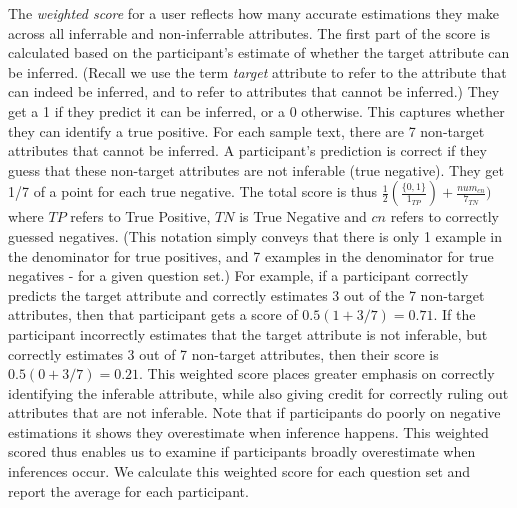 
The \textit{weighted score} for a user reflects how many accurate estimations they make across all inferrable and non-inferrable attributes. The first part of the score is calculated based on the participant's estimate of whether the target attribute can be inferred. (Recall we use the term \textit{target} attribute to refer to the attribute that can indeed be inferred, and  to refer to attributes that cannot be inferred.) They get a 1 if they predict it can be inferred, or a 0 otherwise. This captures whether they can identify a true positive. For each sample text, there are 7 non-target attributes that cannot be inferred. A participant's prediction is correct if they guess that these non-target attributes are not inferable (true negative). They get 1/7 of a point for each true negative. The total score is thus $\frac{1}{2} ( \frac{\{0,1\}}{1_{TP}}) + \frac{num_{cn}}{7_{TN}})$ where $TP$ refers to True Positive, $TN$ is True Negative and $cn$ refers to correctly guessed negatives. (This notation simply conveys that there is only 1 example in the denominator for true positives, and 7 examples in the denominator for true negatives - for a given question set.) For example, if a participant correctly predicts the target attribute and correctly estimates 3 out of the 7 non-target attributes, then that participant gets a score of $0.5(1+3/7)=0.71$. If the participant incorrectly estimates that the target attribute is not inferable, but correctly estimates 3 out of 7 non-target attributes, then their score is $0.5(0+3/7)=0.21$. This weighted score places greater emphasis on correctly identifying the inferable attribute, while also giving credit for correctly ruling out attributes that are not inferable. Note that if participants do poorly on negative estimations it shows they overestimate when inference happens. This weighted scored thus enables us to examine if participants broadly overestimate when inferences occur. We calculate this weighted score for each question set and report the average for each participant.


